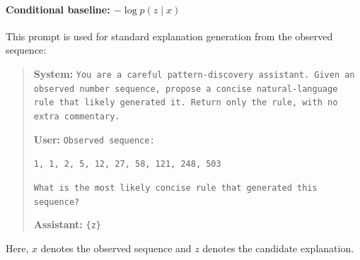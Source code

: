 \documentclass{article}
\theoremstyle{plain}
\theoremstyle{definition}
\theoremstyle{remark}
\begin{document}
\paragraph{Conditional baseline: \texorpdfstring{$-\log p(z \mid x)$}{-log p(z|x)}}
This prompt is used for standard explanation generation from the observed sequence:
\begin{quote}
\textbf{System:} \texttt{You are a careful pattern-discovery assistant. Given an observed number sequence, propose a concise natural-language rule that likely generated it. Return only the rule, with no extra commentary.}

\textbf{User:} \texttt{Observed sequence:}

\texttt{1, 1, 2, 5, 12, 27, 58, 121, 248, 503}

\texttt{What is the most likely concise rule that generated this sequence?}

\textbf{Assistant:} \texttt{\{z\}}
\end{quote}

Here, $x$ denotes the observed sequence and $z$ denotes the candidate explanation.


\end{document}
